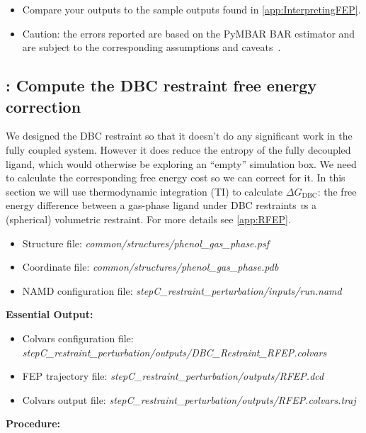 \documentclass[9pt,tutorial,pubversion]{Styling/livecoms}
\newcommand{\filepath}[1]{\textit{#1}}
\begin{document}
\begin{enumerate}
\begin{enumerate}[label=\alph*., ref=\theenumi.\alph*]
\begin{itemize}
            \label{fig:updatePaths}
            \item Compare your outputs to the sample outputs found in \ref{app:InterpretingFEP}.
            \item Caution: the errors reported are based on the PyMBAR BAR estimator and are subject to the corresponding assumptions and caveats~\cite{shirts2008statistically}.
        \end{itemize}
    \end{enumerate}
\end{enumerate}

\subsection{\hspace{-1em}: Compute the DBC restraint free energy correction}
\label{step:restraintPerturbation}
    \begin{tcolorbox}[colback=blue!5!white,colframe=blue!75!black]
    We designed the DBC restraint so that it doesn't do any significant work in the fully coupled system. However it does reduce the entropy of the fully decoupled ligand, which would otherwise be exploring an ``empty'' simulation box. We need to calculate the corresponding free energy cost so we can correct for it. In this section we will use thermodynamic integration (TI) to calculate $\Delta G_\mathrm{DBC}$: the free energy difference between a gas-phase ligand under DBC restraints {\textit vs} a (spherical) volumetric restraint. For more details see \ref{app:RFEP}.
    \end{tcolorbox}

    \begin{itemize}
        \item Structure file: \filepath{common/structures/phenol\_gas\_phase.psf} 
        \item Coordinate file: \filepath{common/structures/phenol\_gas\_phase.pdb}
        \item NAMD configuration file: \filepath{stepC\_restraint\_perturbation/inputs/run.namd}
    \end{itemize}
    \textbf{Essential Output:}
    \begin{itemize}
        \item Colvars configuration file: \filepath{stepC\_restraint\_perturbation/outputs/DBC\_Restraint\_RFEP.colvars}
        \item FEP trajectory file: \filepath{stepC\_restraint\_perturbation/outputs/RFEP.dcd}
        \item Colvars output file: \filepath{stepC\_restraint\_perturbation/outputs/RFEP.colvars.traj}
    \end{itemize}
    \textbf{Procedure:}
\end{document}

